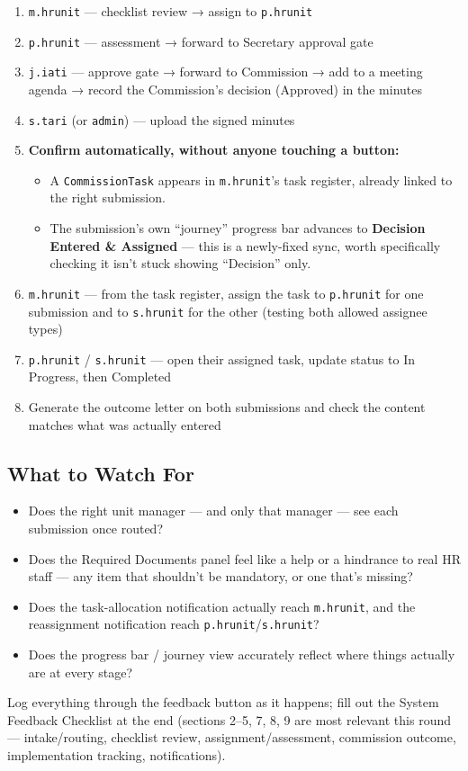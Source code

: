 \documentclass[
  11pt,
  letterpaper,
  DIV=11,
  numbers=noendperiod]{scrartcl}
\providecommand{\tightlist}{%
  \setlength{\itemsep}{0pt}\setlength{\parskip}{0pt}}
\begin{document}
\begin{enumerate}
\def\labelenumi{\arabic{enumi}.}
\tightlist
\item
  \texttt{m.hrunit} --- checklist review → assign to \texttt{p.hrunit}
\item
  \texttt{p.hrunit} --- assessment → forward to Secretary approval gate
\item
  \texttt{j.iati} --- approve gate → forward to Commission → add to a
  meeting agenda → record the Commission's decision (Approved) in the
  minutes
\item
  \texttt{s.tari} (or \texttt{admin}) --- upload the signed minutes
\item
  \textbf{Confirm automatically, without anyone touching a button:}

  \begin{itemize}
  \tightlist
  \item
    A \texttt{CommissionTask} appears in \texttt{m.hrunit}'s task
    register, already linked to the right submission.
  \item
    The submission's own ``journey'' progress bar advances to
    \textbf{Decision Entered \& Assigned} --- this is a newly-fixed
    sync, worth specifically checking it isn't stuck showing
    ``Decision'' only.
  \end{itemize}
\item
  \texttt{m.hrunit} --- from the task register, assign the task to
  \texttt{p.hrunit} for one submission and to \texttt{s.hrunit} for the
  other (testing both allowed assignee types)
\item
  \texttt{p.hrunit} / \texttt{s.hrunit} --- open their assigned task,
  update status to In Progress, then Completed
\item
  Generate the outcome letter on both submissions and check the content
  matches what was actually entered
\end{enumerate}

\subsection{What to Watch For}\label{what-to-watch-for}

\begin{itemize}
\tightlist
\item
  Does the right unit manager --- and only that manager --- see each
  submission once routed?
\item
  Does the Required Documents panel feel like a help or a hindrance to
  real HR staff --- any item that shouldn't be mandatory, or one that's
  missing?
\item
  Does the task-allocation notification actually reach
  \texttt{m.hrunit}, and the reassignment notification reach
  \texttt{p.hrunit}/\texttt{s.hrunit}?
\item
  Does the progress bar / journey view accurately reflect where things
  actually are at every stage?
\end{itemize}

Log everything through the feedback button as it happens; fill out the
System Feedback Checklist at the end (sections 2--5, 7, 8, 9 are most
relevant this round --- intake/routing, checklist review,
assignment/assessment, commission outcome, implementation tracking,
notifications).
\end{document}
